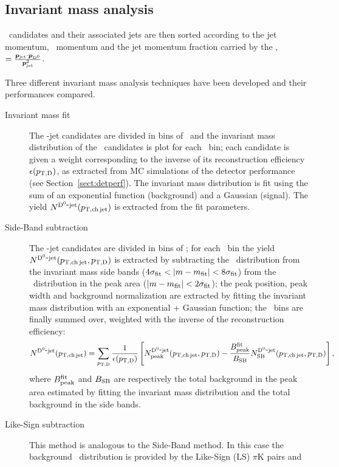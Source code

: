 \documentclass[a4paper]{jpconf}
\begin{document}
\subsection{Invariant mass analysis}
\Dzero\ candidates and their associated jets are then sorted according to the jet momentum, \Dzero\ momentum and the jet momentum
fraction carried by the \Dzero, \zpar$=\frac{\bm{p}_{\rm jet}\cdot{\bm{p}}_{\rm D^0}}{\bm{p}_{\rm jet}^2}$.

Three different invariant mass analysis techniques have been developed and their performances compared.
\begin{description}
\item[Invariant mass fit] The \Dzero-jet candidates are divided in bins of \ptchjet\ and the invariant mass distribution of the \Dzero\ candidates is plot for each \ptchjet\ bin;
each candidate is given a weight corresponding to the inverse of its reconstruction efficiency $\epsilon(p_{\mathrm{T,D}})$, as extracted from MC simulations of the detector performance (see Section~\ref{sect:detperf}).
The invariant mass distribution is fit using the sum of an exponential function (background) and a Gaussian (signal). The yield $N^{\rm \mathrm{D^{0}}\hbox{-}jet}(p_{\mathrm{T,ch\, jet}})$ is extracted from
the fit parameters.
\item[Side-Band subtraction] The \Dzero-jet candidates are divided in bins of \ptd; for each \ptd\ bin the yield $N^{\rm \mathrm{D^{0}}\hbox{-}jet}(p_{\mathrm{T,ch\, jet}},p_{\mathrm{T,D}})$ is extracted by subtracting the
\ptchjet\ distribution from the invariant mass side bands ($4\sigma_{\rm fit} < \lvert m - m_{\rm fit} \rvert < 8\sigma_{\rm fit}$) 
from the \ptchjet\ distribution in the peak area ($\lvert m - m_{\rm fit} \rvert < 2\sigma_{\rm fit}$); the peak position, peak width and background normalization are extracted 
by fitting the invariant mass distribution with an exponential + Gaussian function; the \ptd\ bins are finally summed over, weighted with the inverse of the reconstruction efficiency:
\begin{equation*}
N^{\rm \mathrm{D^{0}}\hbox{-}jet}(p_{\mathrm{T,ch\, jet}})=\sum_{p_{\mathrm{T,D}}} \frac{1}{\epsilon(p_{\mathrm{T,D}})} 
\left[N_{\rm peak}^{\rm \mathrm{D^{0}}\hbox{-}jet}(p_{\mathrm{T,ch\, jet}},p_{\mathrm{T,D}}) - 
\frac{B_{\rm peak}^{\rm fit}}{B_{\rm SB}} 
N_{\rm SB}^{\rm \mathrm{D^{0}}\hbox{-}jet}(p_{\mathrm{T,ch\, jet}},p_{\mathrm{T,D}})\right],
\end{equation*}
where $B_{\rm peak}^{\rm fit}$ and $B_{\rm SB}$ are respectively the total background
in the peak area estimated by fitting the invariant mass distribution and the total
background in the side bands.
\item[Like-Sign subtraction] This method is analogous to the Side-Band method. In this case the background \ptchjet\ distribution is provided by the Like-Sign (LS) $\pi$K pairs and

\end{description}
\end{document}
